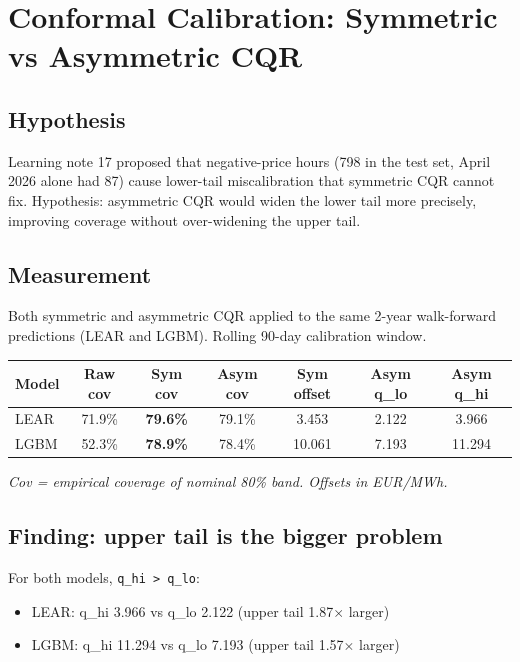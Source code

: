 \section{Conformal Calibration: Symmetric vs Asymmetric CQR}

\subsection{Hypothesis}

Learning note 17 proposed that negative-price hours (798 in the test set,
April 2026 alone had 87) cause lower-tail miscalibration that symmetric CQR
cannot fix. Hypothesis: asymmetric CQR would widen the lower tail more
precisely, improving coverage without over-widening the upper tail.

\subsection{Measurement}

Both symmetric and asymmetric CQR applied to the same 2-year walk-forward
predictions (LEAR and LGBM). Rolling 90-day calibration window.

\begin{center}
\begin{tabular}{lcccccc}
\toprule
Model & Raw cov & Sym cov & Asym cov & Sym offset & Asym q\_lo & Asym q\_hi \\
\midrule
LEAR & 71.9\% & \textbf{79.6\%} & 79.1\% & 3.453 & 2.122 & 3.966 \\
LGBM & 52.3\% & \textbf{78.9\%} & 78.4\% & 10.061 & 7.193 & 11.294 \\
\bottomrule
\end{tabular}
\end{center}

\textit{Cov = empirical coverage of nominal 80\% band. Offsets in EUR/MWh.}

\subsection{Finding: upper tail is the bigger problem}

For both models, \texttt{q\_hi > q\_lo}:

\begin{itemize}
  \item LEAR: q\_hi 3.966 vs q\_lo 2.122 (upper tail 1.87$\times$ larger)
  \item LGBM: q\_hi 11.294 vs q\_lo 7.193 (upper tail 1.57$\times$ larger)
\end{itemize}

